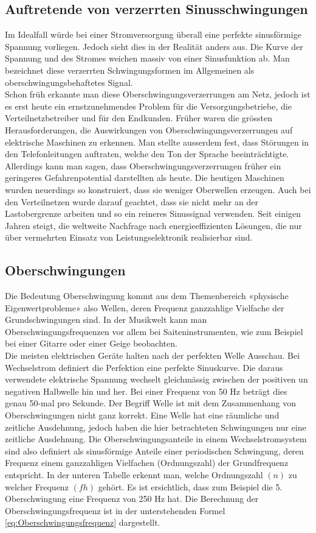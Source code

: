 \subsection{Auftretende von verzerrten Sinusschwingungen}
Im Idealfall würde bei einer Stromversorgung überall eine perfekte sinusförmige Spannung vorliegen. Jedoch sieht dies in der Realität anders aus. Die Kurve der Spannung und des Stromes weichen massiv von einer Sinusfunktion ab. Man bezeichnet diese verzerrten Schwingungsformen im Allgemeinen als oberschwingungsbehaftetes Signal. \\
Schon früh erkannte man diese Oberschwingungsverzerrungen am Netz, jedoch ist es erst heute ein ernstzunehmendes Problem für die Versorgungsbetriebe, die Verteilnetzbetreiber und für den Endkunden. Früher waren die grössten Herausforderungen, die Auswirkungen von Oberschwingungsverzerrungen auf elektrische Maschinen zu erkennen. Man stellte ausserdem fest, dass Störungen in den Telefonleitungen auftraten, welche den Ton der Sprache beeinträchtigte. Allerdings kann man sagen, dass Oberschwingungsverzerrungen früher ein geringeres Gefahrenpotential darstellten als heute. Die heutigen Maschinen wurden neuerdings so konstruiert, dass sie weniger Oberwellen erzeugen. Auch bei den Verteilnetzen wurde darauf geachtet, dass sie nicht mehr an der Lastobergrenze arbeiten und so ein reineres Sinussignal verwenden. Seit einigen Jahren steigt, die weltweite Nachfrage nach energieeffizienten Lösungen, die nur über vermehrten Einsatz von Leistungselektronik realisierbar sind. 
\subsection{Oberschwingungen}
Die Bedeutung Oberschwingung kommt aus dem Themenbereich «physische Eigenwertprobleme» also Wellen, deren Frequenz ganzzahlige Vielfache der Grundschwingungen sind. In der Musikwelt kann man Oberschwingungsfrequenzen vor allem bei Saiteninstrumenten, wie zum Beispiel bei einer Gitarre oder einer Geige beobachten.\\
Die meisten elektrischen Geräte halten nach der perfekten Welle Ausschau. Bei Wechselstrom definiert die Perfektion eine perfekte Sinuskurve. Die daraus verwendete elektrische Spannung wechselt gleichmässig zwischen der positiven un negativen Halbwelle hin und her. Bei einer Frequenz von 50 Hz beträgt dies genau 50-mal pro Sekunde. Der Begriff Welle ist mit dem Zusammenhang von Oberschwingungen nicht ganz korrekt. Eine Welle hat eine räumliche und zeitliche Ausdehnung, jedoch haben die hier betrachteten Schwingungen nur eine zeitliche Ausdehnung. Die Oberschwingungsanteile in einem Wechselstromsystem sind also definiert als sinusförmige Anteile einer periodischen Schwingung, deren Frequenz einem ganzzahligen Vielfachen (Ordnungszahl) der Grundfrequenz entspricht. In der unteren Tabelle erkennt man, welche Ordnungszahl $(n)$  zu welcher Frequenz $(fh)$ gehört. Es ist ersichtlich, dass zum Beispiel die 5. Oberschwingung eine Frequenz von 250 Hz hat. Die Berechnung der Oberschwingungsfrequenz ist in der unterstehenden Formel \ref{eq:Oberschwingungsfrequenz} dargestellt.

